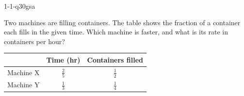 \begin{practiceQuestion}{1-1-q30}{gsa}
\begin{questionText}
Two machines are filling containers. The table shows the fraction of a container each fills in the given time. Which machine is faster, and what is its rate in containers per hour?

\begin{center}
\begin{tabular}{|c|c|c|}
\hline
 & \textbf{Time (hr)} & \textbf{Containers filled} \\ \hline
Machine X & $\frac{2}{5}$ & $\frac{1}{2}$ \\ \hline
Machine Y & $\frac{1}{3}$ & $\frac{1}{4}$ \\ \hline
\end{tabular}
\end{center}
\end{questionText}
\end{practiceQuestion}

